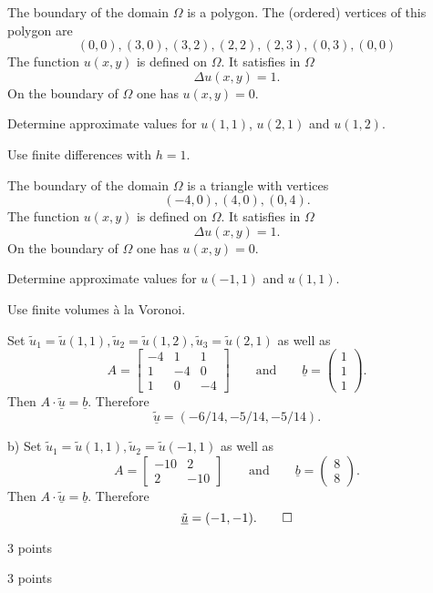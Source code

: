 \begin{teilaufgaben}
\item
{}
The boundary of the domain $\Omega$ is a polygon.
The (ordered) vertices of this polygon are
\[
(0,0), (3,0), (3, 2), (2, 2), (2, 3), (0, 3), (0,0)
\]
The function $u(x,y)$ is defined on $\Omega$.
It satisfies in $\Omega$ 
\[
\Delta u(x,y) = 1.
\]
On the boundary of $\Omega$ one has $u(x,y) = 0$. 

Determine approximate values for $u(1,1)$, $u(2,1)$ and $u(1,2)$. 

Use finite differences with $h = 1$.

\item
{}
The boundary of the domain $\Omega$ is a triangle with vertices
\[
(-4,0), (4,0), (0, 4).
\]
The function $u(x,y)$ is defined on $\Omega$.
It satisfies in $\Omega$ 
\[
\Delta u(x,y) = 1.
\]
On the boundary of $\Omega$ one has $u(x,y) = 0$.

Determine approximate values for $u(-1,1)$ and $u(1,1)$.

Use finite volumes \`a la Voronoi.  
\end{teilaufgaben}

\begin{loesung}
\begin{teilaufgaben}
\item
Set
$\tilde u_1
=
\tilde u(1,1), \tilde u_2
=
\tilde u(1,2), \tilde u_3
=
\tilde u(2,1)$
as well as
\[
A
=
\left[\begin{array}{rrr} -4 & 1 & 1  \\ 1 & -4 & 0 \\ 1 & 0 & -4 \end{array}\right]
\qquad\text{and}\qquad
\underline{b}
=
\left(\begin{array}{r} 1 \\ 1  \\ 1 \end{array}\right).
\]
Then $A \cdot \underline{\tilde u} = \underline{b}$.
Therefore
\[
\underline{\tilde u} = (-6/14,-5/14,-5/14).
\]
\item
b) Set $\tilde u_1 = \tilde u(1,1), \tilde u_2 = \tilde u(-1,1)$ as well as
\[
A
=
\left[\begin{array}{rr} -10 & 2  \\ 2 & -10  \end{array}\right]
\qquad\text{and}\qquad
\underline{b}
=
\left(\begin{array}{r} 8 \\ 8 \end{array}\right).
\]
Then $A \cdot \underline{\tilde u} = \underline{b}$.
Therefore
\[
\underline{\tilde u} = (-1,-1).
\qedhere
\]
\end{teilaufgaben}
\end{loesung}

\begin{bewertung}
\begin{teilaufgaben}
\item 3 points
\item 3 points
\end{teilaufgaben}
\end{bewertung}

